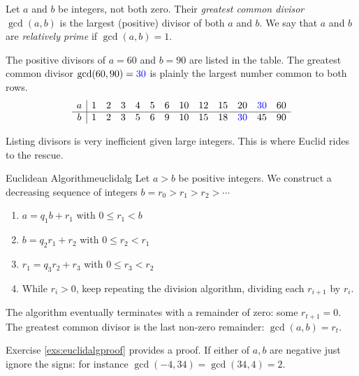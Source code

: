 \begin{defn}{}{}
	Let $a$ and $b$ be integers, not both zero. Their \emph{greatest common divisor} $\gcd(a,b)$ is the largest (positive) divisor of both $a$ and $b$. We say that $a$ and $b$ are \emph{relatively prime} if $\gcd(a,b)=1$.
\end{defn}

\begin{example}{}{}
	The positive divisors of $a=60$ and $b=90$ are listed in the table. The greatest common divisor $\gcd(60,90)=\textcolor{blue}{30}$ is plainly the largest number common to both rows.
	\[
		\begin{array}{c|cccccccccccc}
			a&1&2&3&4&5&6&10&12&15&20&\textcolor{blue}{30}&60\\\hline
			b&1&2&3&5&6&9&10&15&18&\textcolor{blue}{30}&45&90
		\end{array}
	\]
\end{example}

Listing divisors is very inefficient given large integers. This is where Euclid rides to the rescue.

\begin{thm}{Euclidean Algorithm}{euclidalg}
	Let $a>b$ be positive integers. We construct a decreasing sequence of integers $b=r_0>r_1>r_2>\cdots$
	\begin{enumerate}\itemsep1pt
		\item {}$a=q_1b+r_1$ with $0\le r_1<b$
		\item {}$b=q_2r_1+r_2$ with $0\le r_2<r_1$
		\item {}$r_1=q_3r_2+r_3$ with $0\le r_3<r_2$
		\item While $r_i>0$, keep repeating the division algorithm, dividing each $r_{i+1}$ by $r_i$.
	\end{enumerate}
	The algorithm eventually terminates with a remainder of zero: some $r_{t+1}=0$. The greatest common divisor is the last non-zero remainder: $\gcd(a,b)=r_t$.
\end{thm}

Exercise \ref{exs:euclidalgproof} provides a proof. 
If either of $a,b$ are negative just ignore the signs: for instance $\gcd(-4,34)=\gcd(34,4)=2$.

